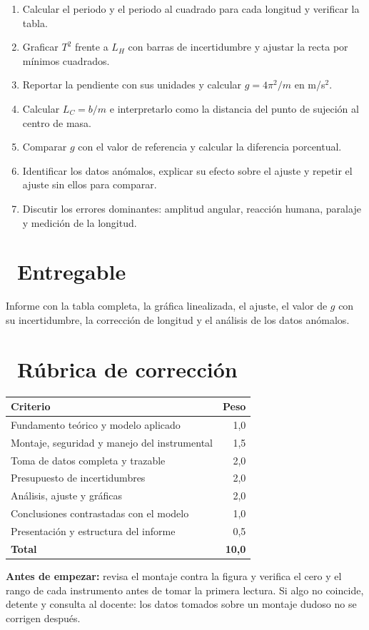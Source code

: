\documentclass[11pt,a4paper]{article}
\newcommand{\iconotexto}[2]{\textcolor{cyanNeon}{\faIcon{#1}}~#2}
\begin{document}
\begin{enumerate}[leftmargin=1.4em,itemsep=2pt,topsep=3pt]
  \item Calcular el periodo y el periodo al cuadrado para cada longitud y verificar la tabla.
  \item Graficar $T^2$ frente a $L_H$ con barras de incertidumbre y ajustar la recta por mínimos cuadrados.
  \item Reportar la pendiente con sus unidades y calcular $g = 4\pi^2/m$ en m/s$^2$.
  \item Calcular $L_C = b/m$ e interpretarlo como la distancia del punto de sujeción al centro de masa.
  \item Comparar $g$ con el valor de referencia y calcular la diferencia porcentual.
  \item Identificar los datos anómalos, explicar su efecto sobre el ajuste y repetir el ajuste sin ellos para comparar.
  \item Discutir los errores dominantes: amplitud angular, reacción humana, paralaje y medición de la longitud.
\end{enumerate}

\section{\iconotexto{box-open}{Entregable}}

Informe con la tabla completa, la gráfica linealizada, el ajuste, el valor de $g$ con su incertidumbre, la corrección de longitud y el análisis de los datos anómalos.

\section{\iconotexto{ruler-combined}{Rúbrica de corrección}}

\begin{tabularx}{\linewidth}{@{}X r@{}}
\toprule
Criterio & Peso\\
\midrule
Fundamento teórico y modelo aplicado & 1,0 \\
Montaje, seguridad y manejo del instrumental & 1,5 \\
Toma de datos completa y trazable & 2,0 \\
Presupuesto de incertidumbres & 2,0 \\
Análisis, ajuste y gráficas & 2,0 \\
Conclusiones contrastadas con el modelo & 1,0 \\
Presentación y estructura del informe & 0,5 \\
\midrule
\textbf{Total} & \textbf{10,0}\\
\bottomrule
\end{tabularx}

\begin{tcolorbox}[cajaMejora]\textbf{Antes de empezar:} revisa el montaje contra la figura y verifica el cero y el rango de cada instrumento antes de tomar la primera lectura. Si algo no coincide, detente y consulta al docente: los datos tomados sobre un montaje dudoso no se corrigen después.
\end{tcolorbox}
\end{document}
